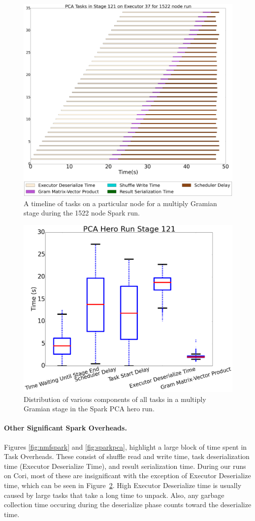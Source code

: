 \begin{figure}[tbhp]
\centering
\includegraphics[width=.6\textwidth]{fig/spark_pca_hero_timeline.png}
\caption{A timeline of tasks on a particular node for a multiply Gramian stage during the 1522 node Spark run. }
\label{fig:hero-timeline}
\end{figure}

\begin{figure}[tbhp]
\centering
\includegraphics[width=.6\textwidth]{fig/pca_box_and_whiskers.png}
\caption{Distribution of various components of all tasks in a multiply Gramian stage in the Spark PCA hero run. }
\label{fig:whisker}
\end{figure}
\paragraph{Other Significant Spark Overheads.}
Figures \ref{fig:nmfspark} and \ref{fig:sparkpca}, highlight a large block of time spent in Task Overheads. These consist of  shuffle read and write time, task deserialization time (Executor Deserialize Time), and result serialization time.  During our runs on Cori, most of these are insignificant with the exception of Executor Deserialize time, which can be seen in  Figure~\ref{fig:whisker}.  High Executor Deserialize time is usually caused by large tasks that take a long time to unpack. Also, any garbage collection time occuring during the deserialize phase counts toward the deserialize time.

